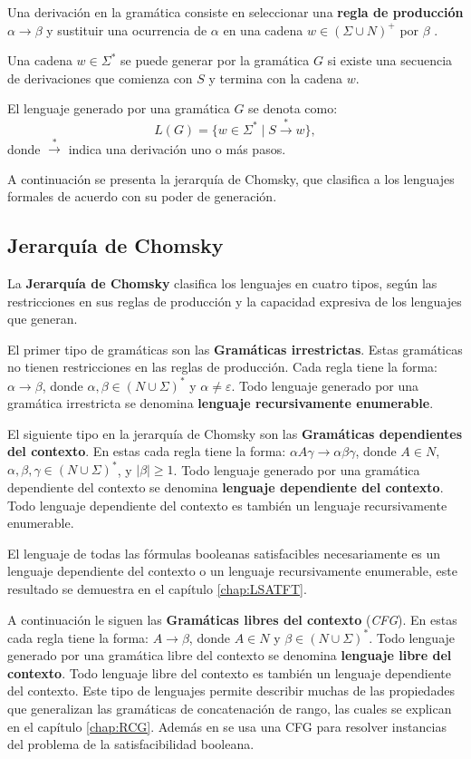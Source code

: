 \documentclass[12pt]{article}
\begin{document}
Una derivación en la gramática consiste en seleccionar una \textbf{regla de producción} $\alpha \to \beta$ y sustituir una ocurrencia de
$\alpha$ en una cadena $w\in (\Sigma \cup N)^+$ por $\beta$ \cite{authomataTheory}.

Una cadena $w\in\Sigma^*$  se puede generar por la gramática $G$ si existe una secuencia de derivaciones que comienza con $S$
y termina con la cadena $w$.

El lenguaje generado por una gramática \(G\) se denota como:
\[
  L(G) = \{ w \in \Sigma^* \mid S \overset{*}{\to} w \},
\]
donde \(\overset{*}{\to}\) indica una derivación uno o más pasos.

A continuación se presenta la jerarquía de Chomsky, que clasifica a los lenguajes formales de acuerdo con su poder de generación.

\subsection{Jerarquía de Chomsky}

La \textbf{Jerarquía de Chomsky} \cite{hunter2020chomsky} clasifica los lenguajes en cuatro tipos, según las restricciones en sus reglas de 
producción y la capacidad expresiva de los lenguajes que generan.

El primer tipo de gramáticas son las \textbf{Gramáticas irrestrictas}. Estas gramáticas no tienen restricciones en las reglas de producción.
Cada regla tiene la forma: \(\alpha \to \beta\), donde \(\alpha, \beta \in (N \cup \Sigma)^*\) y \(\alpha \neq \varepsilon\).
Todo lenguaje generado por una gramática irrestricta se denomina \textbf{lenguaje recursivamente enumerable}. 

El siguiente tipo en la jerarquía de Chomsky son las \textbf{Gramáticas dependientes del contexto}. En estas cada regla tiene la forma: \(\alpha A \gamma \to \alpha \beta \gamma\), donde \(A \in N\), \(\alpha, \beta, \gamma \in (N \cup \Sigma)^*\), y \(|\beta| \geq 1\).
Todo lenguaje generado por una gramática dependiente del contexto se denomina \textbf{lenguaje dependiente del contexto}.
Todo lenguaje dependiente del contexto es también un lenguaje recursivamente enumerable. 

El lenguaje de todas las fórmulas booleanas satisfacibles necesariamente es un lenguaje dependiente del contexto o un lenguaje
recursivamente enumerable, este resultado se demuestra en el capítulo \ref{chap:LSATFT}.

A continuación le siguen las \textbf{Gramáticas libres del contexto} (\textit{CFG}). En estas cada regla tiene la forma: \(A \to \beta\), donde \(A \in N\) y \(\beta \in (N \cup \Sigma)^*\).
Todo lenguaje generado por una gramática libre del contexto se denomina \textbf{lenguaje libre del contexto}.
Todo lenguaje libre del contexto es también un lenguaje dependiente del contexto. Este tipo de lenguajes permite describir 
muchas de las propiedades que generalizan las gramáticas de concatenación de rango, las cuales se explican en el capítulo
\ref{chap:RCG}. Además en \cite{aCFSAT} se usa una CFG para resolver instancias del problema de la satisfacibilidad booleana.
\end{document}
